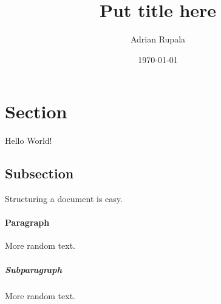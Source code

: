 \documentclass{article}
\title{~Put title here~}
\date{\today}
\author{Adrian Rupala}
\begin{document}
	\maketitle
	\newpage
	
	\section{Section}
	Hello World!
	
	\subsection{Subsection}
	Structuring a document is easy.
	
	\paragraph{Paragraph}
	More random text.
	
	\subparagraph{Subparagraph}
	More random text.
\end{document}
